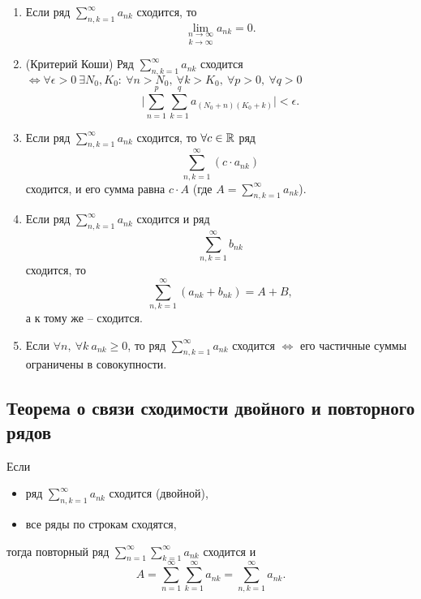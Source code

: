 \begin{theorem}\leavevmode
    \begin{enumerate}
        \item Если ряд $ \sum_{n,k = 1}^{\infty} a_{nk} $ сходится, то
              \[
                  \underset{k\rightarrow\infty}{\underset{n\rightarrow\infty}{\lim}}a_{nk} = 0.
              \]

        \item (Критерий Коши)
              Ряд $ \sum_{n,k = 1}^{\infty} a_{nk} $ сходится $\iff \forall \epsilon > 0 \ \exists N_0,K_0: \ \forall n > N_0, \ \forall k > K_0, \ \forall p > 0, \ \forall q > 0$
              \[
                  \bigg|\sum_{n=1}^{p}\sum_{k=1}^{q}a_{(N_0 + n)(K_0 + k)}\bigg| < \epsilon.
              \]

        \item Если ряд $ \sum_{n,k = 1}^{\infty} a_{nk} $ сходится, то $\forall c \in \mathbb{R}$ ряд
              \[
                  \sum_{n,k=1}^{\infty}(c\cdot a_{nk})
              \]
              сходится, и его сумма равна $c\cdot A$ (где $A = \sum_{n,k=1}^{\infty}a_{nk}$).

        \item Если ряд $ \sum_{n,k = 1}^{\infty} a_{nk} $ сходится и ряд
              \[
                  \sum_{n,k=1}^{\infty}b_{nk}
              \]
              сходится, то
              \[
                  \sum_{n,k=1}^{\infty}(a_{nk} + b_{nk}) = A + B,
              \]
              а к тому же -- сходится.

        \item Если $\forall n, \ \forall k \ a_{nk} \geqslant 0$, то ряд $ \sum_{n,k = 1}^{\infty} a_{nk} $ сходится $ \iff $ его частичные суммы ограничены в совокупности.
    \end{enumerate}
\end{theorem}

\subsection{Теорема о связи сходимости двойного и повторного рядов}

\begin{theorem}
    Если
    \begin{itemize}
        \item ряд $ \sum_{n,k = 1}^{\infty} a_{nk} $ сходится (двойной),
        \item все ряды по строкам сходятся,
    \end{itemize}
    тогда повторный ряд $ \sum_{n=1}^{\infty}\sum_{k=1}^{\infty}a_{nk} $ сходится и
    \[
        A = \sum_{n=1}^{\infty}\sum_{k=1}^{\infty}a_{nk} = \sum_{n,k=1}^{\infty}a_{nk}.
    \]
\end{theorem}


